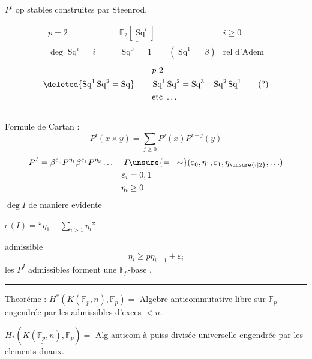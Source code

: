 $P^i$ op stables construites par Steenrod.

\[
\begin{aligned}
p=2\qquad &\underline{\mathbb F_2[\operatorname{Sq}^{i}]} & i\geq0\\
\deg\operatorname{Sq}^{i}=i\qquad&
\operatorname{Sq}^{0}=1\qquad(\operatorname{Sq}^{1}=\beta)&\text{rel d'Adem}
\end{aligned}
\]
\[
\begin{aligned}
&\hspace{13em}p\ 2\\
&\deleted{\operatorname{Sq}^{1}\operatorname{Sq}^{2}=\operatorname{Sq}}\qquad
\operatorname{Sq}^{1}\operatorname{Sq}^{2}=\operatorname{Sq}^{3}+\operatorname{Sq}^{2}\operatorname{Sq}^{1}\qquad(?)\\
&\hspace{13em}\text{etc}\ \ldots
\end{aligned}
\]
\begin{center}\rule{1.3cm}{0.3pt}\end{center}
Formule de Cartan :
\[
P^i(x\times y)=\sum_{j\geq0}P^j(x)P^{i-j}(y)
\]
\[
\begin{aligned}
P^I&=\beta^{\varepsilon_0}P^{\eta_1}\beta^{\varepsilon_1}P^{\eta_2}\ldots
& I&\unsure{=|\sim}(\varepsilon_0,\eta_1,\varepsilon_1,\eta_{\unsure{i|2}},\ldots)\\
&& \varepsilon_i&=0,1\\
&& \eta_i&\geq0
\end{aligned}
\]
$\deg I$ de maniere evidente

 $e(I)=\text{``}\eta_1-\sum_{i>1}\eta_i\text{''}$

admissible
\[
\eta_i\geq p\eta_{i+1}+\varepsilon_i
\]
les $P^I$ admissibles forment une $\mathbb F_p$-base .

\begin{center}\rule{1.8cm}{0.3pt}\end{center}
\uline{Theoréme} : 
$H^{*}(K(\mathbb F_p,n),\mathbb F_p)={}$ Algebre anticommutative libre sur $\mathbb F_p$ engendrée par les \uline{ admissibles} d'exces $<n$.

$H_{*}(\underline{K(\mathbb F_p,n)},\mathbb F_p)={}$ Alg anticom à puiss divisée universelle engendrée par les elements duaux.
